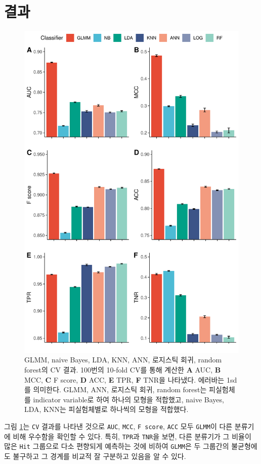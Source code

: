 \documentclass[10pt,onecolumn,twoside,a4size]{gsag3jnl}
\begin{document}
\section{결과}

\begin{figure}[tp]
  \renewcommand{\familydefault}{\sfdefault}\normalfont
  \centering
  \includegraphics[width=0.7\linewidth]{Rplot.pdf}
  \caption{\small GLMM, naive Bayes, LDA, KNN, ANN, 로지스틱 회귀, random forest의 CV 결과. 100번의 10-fold CV를 통해 계산한 \textbf{A} AUC, \textbf{B} MCC, \textbf{C} F score, \textbf{D} ACC, \textbf{E} TPR, \textbf{F} TNR을 나타냈다. 에러바는 1sd를 의미한다. GLMM, ANN, 로지스틱 회귀, random forest는 피실험체를 indicator variable로 하여 하나의 모형을 적합했고, naive Bayes, LDA, KNN는 피실험체별로 하나씩의 모형을 적합했다.}
  \label{fig:cv}
\end{figure}

그림 \ref{fig:cv}는 \texttt{CV} 결과를 나타낸 것으로 \texttt{AUC}, \texttt{MCC}, \texttt{F score}, \texttt{ACC} 모두 \texttt{GLMM}이 다른 분류기에 비해 우수함을 확인할 수 있다. 특히, \texttt{TPR}과 \texttt{TNR}을 보면, 다른 분류기가 그 비율이 많은 \texttt{Hit} 그룹으로 다소 편향되게 예측하는 것에 비하여 \texttt{GLMM}은 두 그룹간의 불균형에도 불구하고 그 경계를 비교적 잘 구분하고 있음을 알 수 있다.
\end{document}
